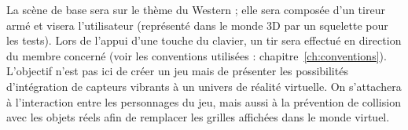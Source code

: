 La scène de base sera sur le thème du Western ; elle sera composée d'un tireur armé et visera l'utilisateur (représenté dans le monde 3D par un squelette pour les tests). Lors de l'appui d'une touche du clavier, un tir sera effectué en direction du membre concerné (voir les conventions utilisées : chapitre~\ref{ch:conventions}). \\
L'objectif n'est pas ici de créer un jeu mais de présenter les possibilités d'intégration de capteurs vibrants à un univers de réalité virtuelle. On s'attachera à l'interaction entre les personnages du jeu, mais aussi à la prévention de collision avec les objets réels afin de remplacer les grilles affichées dans le monde virtuel.

